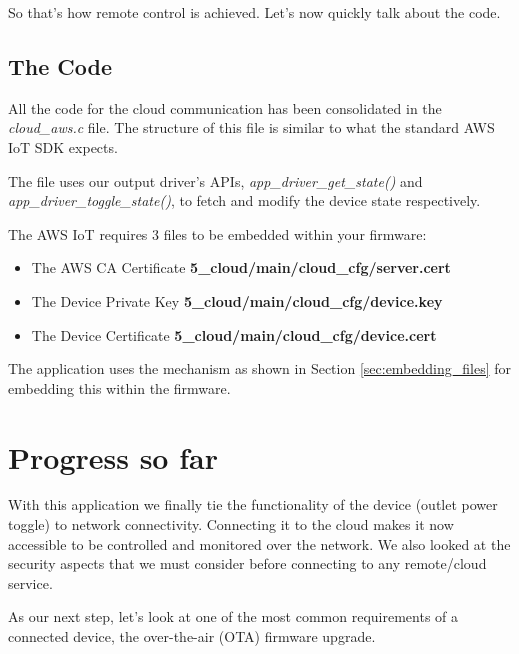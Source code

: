\documentclass[main.tex]{subfiles}
\begin{document}
So that's how remote control is achieved. Let's now quickly talk about the code.

\subsection{The Code}
All the code for the cloud communication has been consolidated in the \textit{cloud\_aws.c} file. The structure of this file is similar to what the standard AWS IoT SDK expects.

The file uses our output driver's APIs, \textit{app\_driver\_get\_state()} and \textit{app\_driver\_toggle\_state()}, to fetch and modify the device state respectively.

The AWS IoT requires 3 files to be embedded within your firmware:
\begin{itemize}
        \item The AWS CA Certificate  \textbf{5\_cloud/main/cloud\_cfg/server.cert}
        \item The Device Private Key  \textbf{5\_cloud/main/cloud\_cfg/device.key}
        \item The Device Certificate  \textbf{5\_cloud/main/cloud\_cfg/device.cert}
\end{itemize}
The application uses the mechanism as shown in Section \ref{sec:embedding_files} for embedding this within the firmware.

\section{Progress so far}
With this application we finally tie the functionality of the device (outlet power toggle) to network connectivity. Connecting it to the cloud makes it now accessible to be controlled and monitored over the network. We also looked at the security aspects that we must consider before connecting to any remote/cloud service.

As our next step, let's look at one of the most common requirements of a connected device, the over-the-air (OTA) firmware upgrade.
\end{document}
